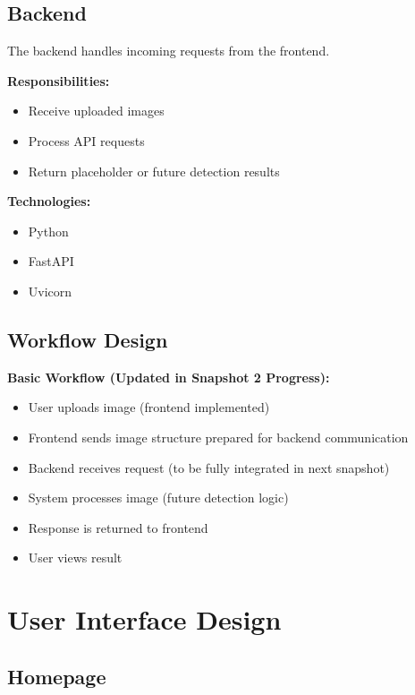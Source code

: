 \documentclass[12pt]{article}
\begin{document}
\subsection{Backend}

The backend handles incoming requests from the frontend.

\textbf{Responsibilities:}
\begin{itemize}[noitemsep]
    \item Receive uploaded images
    \item Process API requests
    \item Return placeholder or future detection results
\end{itemize}

\textbf{Technologies:}
\begin{itemize}[noitemsep]
    \item Python
    \item FastAPI
    \item Uvicorn
\end{itemize}

\subsection{Workflow Design}

\textbf{Basic Workflow (Updated in Snapshot 2 Progress):}
\begin{itemize}[noitemsep]
    \item User uploads image (frontend implemented)
    \item Frontend sends image structure prepared for backend communication
    \item Backend receives request (to be fully integrated in next snapshot)
    \item System processes image (future detection logic)
    \item Response is returned to frontend
    \item User views result
\end{itemize}

\section{User Interface Design}

\subsection{Homepage}
\end{document}
